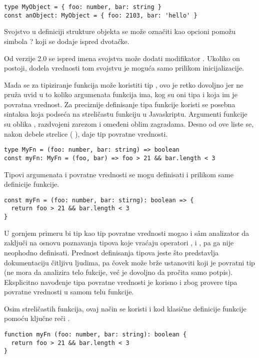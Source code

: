 \begin{verbatim}
type MyObject = { foo: number, bar: string }
const anObject: MyObject = { foo: 2103, bar: 'hello' }
\end{verbatim}

Svojstvo u definiciji strukture objekta se može označiti kao opcioni pomožu simbola \code ? koji se dodaje ispred dvotačke.

Od verzije 2.0 se ispred imena svojstva može dodati modifikator .
Ukoliko on postoji, dodela vrednosti tom svojstvu je moguća samo prilikom inicijalizacije.

Mada se za tipiziranje funkcija može koristiti tip , ovo je retko dovoljno jer ne pruža uvid u to koliko argumenata funkcija ima, kog su oni tipa i koja im je povratna vrednost.
Za preciznije definisanje tipa funkcije koristi se posebna sintaksa koja podseća na streličastu funkciju u Javaskriptu.
Argumenti funkcije su oblika , razdvojeni zarezom i omeđeni oblim zagradama.
Desno od ove liste se, nakon debele strelice ( \code{=>}), daje tip povratne vrednosti.

\begin{verbatim}
type MyFn = (foo: number, bar: string) => boolean
const myFn: MyFn = (foo, bar) => foo > 21 && bar.length < 3
\end{verbatim}

Tipovi argumenata i povratne vrednosti se mogu definisati i prilikom same definicije funkcije.

\begin{verbatim}
const myFn = (foo: number, bar: stirng): boolean => {
  return foo > 21 && bar.length < 3
}
\end{verbatim}

U gornjem primeru bi tip  kao tip povratne vrednosti mogao i sâm analizator da zaključi na osnovu poznavanja tipova koje vraćaju operatori \code{\&\&}, \code{>} i \code{<}, pa ga nije neophodno definisati.
Prednost definisanja tipova jeste što predstavlja dokumentaciju čitljivu ljudima, pa čovek može brže ustanoviti koji je povratni tip (ne mora da analizira telo fukcije, već je dovoljno da pročita samo potpis).
Eksplicitno navođenje tipa povratne vrednosti je korisno i zbog provere tipa povratne vrednosti u samom telu funkcije.

Osim streličastih funkcija, ovaj način se koristi i kod klasične definicije funkcije pomoću ključne reči .

\begin{verbatim}
function myFn (foo: number, bar: string): boolean {
  return foo > 21 && bar.length < 3
}
\end{verbatim}

